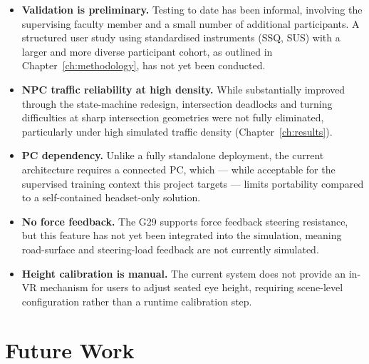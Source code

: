 \begin{itemize}
    \item \textbf{Validation is preliminary.} Testing to date has been informal, involving the supervising faculty member and a small number of additional participants. A structured user study using standardised instruments (SSQ, SUS) with a larger and more diverse participant cohort, as outlined in Chapter~\ref{ch:methodology}, has not yet been conducted.
    
    \item \textbf{NPC traffic reliability at high density.} While substantially improved through the state-machine redesign, intersection deadlocks and turning difficulties at sharp intersection geometries were not fully eliminated, particularly under high simulated traffic density (Chapter~\ref{ch:results}).
    
    \item \textbf{PC dependency.} Unlike a fully standalone deployment, the current architecture requires a connected PC, which — while acceptable for the supervised training context this project targets — limits portability compared to a self-contained headset-only solution.
    
    \item \textbf{No force feedback.} The G29 supports force feedback steering resistance, but this feature has not yet been integrated into the simulation, meaning road-surface and steering-load feedback are not currently simulated.
    
    \item \textbf{Height calibration is manual.} The current system does not provide an in-VR mechanism for users to adjust seated eye height, requiring scene-level configuration rather than a runtime calibration step.
\end{itemize}

\section{Future Work}

